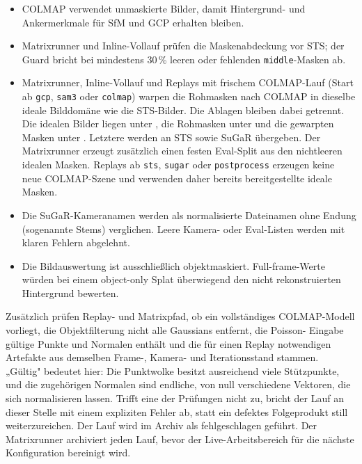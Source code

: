 \begin{itemize}
  \item COLMAP verwendet unmaskierte Bilder, damit Hintergrund- und
        Ankermerkmale für SfM und GCP erhalten bleiben.
  \item Matrixrunner und Inline-Vollauf prüfen die Maskenabdeckung vor STS;
        der Guard bricht bei mindestens 30\,\% leeren oder fehlenden
        \texttt{middle}-Masken ab.
  \item Matrixrunner, Inline-Vollauf und Replays mit frischem COLMAP-Lauf
        (Start ab \texttt{gcp}, \texttt{sam3} oder \texttt{colmap}) warpen die
        Rohmasken nach COLMAP in dieselbe ideale Bilddomäne wie die
        STS-Bilder. Die Ablagen bleiben dabei getrennt. Die idealen Bilder
        liegen unter , die Rohmasken
        unter  und die gewarpten Masken unter
        . Letztere werden an STS sowie SuGaR
        übergeben. Der Matrixrunner erzeugt zusätzlich einen festen Eval-Split
        aus den nichtleeren idealen Masken. Replays ab \texttt{sts},
        \texttt{sugar} oder \texttt{postprocess} erzeugen keine neue
        COLMAP-Szene und verwenden daher bereits bereitgestellte ideale
        Masken.
  \item Die SuGaR-Kameranamen werden als normalisierte Dateinamen ohne
        Endung (sogenannte Stems) verglichen. Leere
        Kamera- oder Eval-Listen werden mit klaren Fehlern abgelehnt.
  \item Die Bildauswertung ist ausschließlich objektmaskiert. Full-frame-Werte
        würden bei einem object-only Splat überwiegend den nicht rekonstruierten
        Hintergrund bewerten.
\end{itemize}

Zusätzlich prüfen Replay- und Matrixpfad, ob ein vollständiges COLMAP-Modell
vorliegt, die Objektfilterung nicht alle Gaussians entfernt, die Poisson-
Eingabe gültige Punkte und Normalen enthält und die für einen Replay
notwendigen Artefakte aus demselben Frame-, Kamera- und Iterationsstand
stammen. „Gültig" bedeutet hier: Die Punktwolke besitzt ausreichend viele
Stützpunkte, und die zugehörigen Normalen sind endliche, von null
verschiedene Vektoren, die sich normalisieren lassen. Trifft eine der
Prüfungen nicht zu, bricht der Lauf an dieser Stelle mit einem expliziten
Fehler ab, statt ein defektes Folgeprodukt still weiterzureichen. Der Lauf
wird im Archiv als fehlgeschlagen geführt. Der Matrixrunner archiviert jeden
Lauf, bevor der Live-Arbeitsbereich für die nächste Konfiguration bereinigt
wird.

